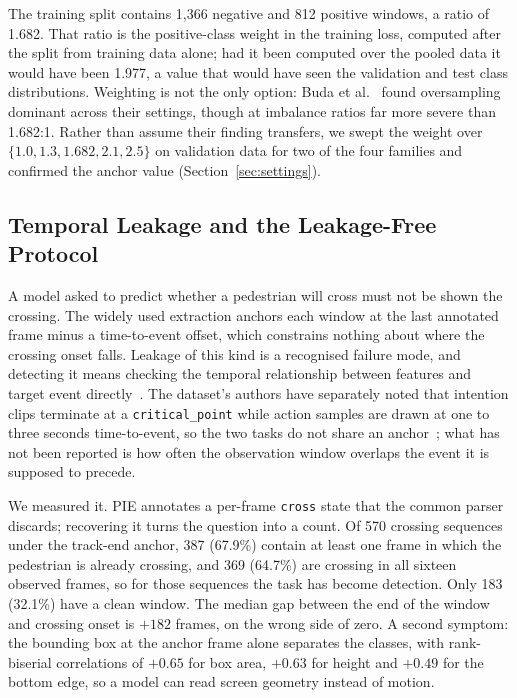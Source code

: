 \documentclass[mti,article,submit,moreauthors]{Definitions/mdpi}
\begin{document}
The training split contains 1,366 negative and 812 positive windows, a ratio of 1.682. That ratio is the positive-class weight in the training loss, computed after the split from training data alone; had it been computed over the pooled data it would have been 1.977, a value that would have seen the validation and test class distributions. Weighting is not the only option: Buda et al.~\citep{buda2018systematic} found oversampling dominant across their settings, though at imbalance ratios far more severe than 1.682:1. Rather than assume their finding transfers, we swept the weight over $\{1.0, 1.3, 1.682, 2.1, 2.5\}$ on validation data for two of the four families and confirmed the anchor value (Section~\ref{sec:settings}).

\subsection{Temporal Leakage and the Leakage-Free Protocol}

A model asked to predict whether a pedestrian will cross must not be shown the crossing. The widely used extraction anchors each window at the last annotated frame minus a time-to-event offset, which constrains nothing about where the crossing onset falls. Leakage of this kind is a recognised failure mode, and detecting it means checking the temporal relationship between features and target event directly~\citep{kaufman2012leakage}. The dataset's authors have separately noted that intention clips terminate at a \texttt{critical\_point} while action samples are drawn at one to three seconds time-to-event, so the two tasks do not share an anchor~\citep{rasouli2024diving}; what has not been reported is how often the observation window overlaps the event it is supposed to precede.

We measured it. PIE annotates a per-frame \texttt{cross} state that the common parser discards; recovering it turns the question into a count. Of 570 crossing sequences under the track-end anchor, 387 (67.9\%) contain at least one frame in which the pedestrian is already crossing, and 369 (64.7\%) are crossing in all sixteen observed frames, so for those sequences the task has become detection. Only 183 (32.1\%) have a clean window. The median gap between the end of the window and crossing onset is $+182$ frames, on the wrong side of zero. A second symptom: the bounding box at the anchor frame alone separates the classes, with rank-biserial correlations of $+0.65$ for box area, $+0.63$ for height and $+0.49$ for the bottom edge, so a model can read screen geometry instead of motion.
\end{document}
